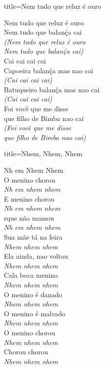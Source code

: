 \documentclass[fontsize=14pt, paper=a4, twoside, DIV=20]{scrreprt} %
\begin{document}
\begin{multicols*}{2}
\begin{song}{title={Nem tudo que reluz é ouro}}
        \begin{verse*}
            Nem tudo que reluz é ouro\\
            Nem tudo que balanḉa cai\\
            \textit{(Nem tudo que reluz é ouro}\\
            \textit{Nem tudo que balanḉa cai)}\\
            Cai cai cai cai\\
            Capoeira balanḉa mas nao cai\\
            \textit{(Cai cai cai cai)}\\
            Batuqueiro balanḉa mas nao cai\\
            \textit{(Cai cai cai cai)}\\
            Foi você que me disse\\
            que filho de Bimba nao cai\\
            \textit{(Foi você que me disse}\\
            \textit{que filho de Bimba nao cai)}\\
        \end{verse*}
\end{song}

\begin{song}{title={Nhem, Nhem, Nhem}}
        \begin{verse*}
            Nh em Nhem Nhem\\
            O menino chorou\\
            \textit{Nh} \textit{em nhem nhem}\\
            E menino chorou\\
            \textit{Nh} \textit{em nhem nhem}\\
            rque não mamou\\
            \textit{Nh} \textit{em nhem nhem}\\
            Sua mãe tá na feira\\
            \textit{Nhem nhem nhem}\\
            Ela ainda, nao voltou\\
            \textit{Nhem nhem nhem}\\
            Cala boca menino\\
            \textit{Nhem nhem nhem}\\
            O menino é danado\\
            \textit{Nhem nhem nhem}\\
            O menino é malvado\\
            \textit{Nhem nhem nhem}\\
            O menino chorou\\
            \textit{Nhem nhem nhem}\\
            Chorou chorou\\
            \textit{Nhem nhem nhem}\\
        \end{verse*}
\end{song}


\end{multicols*}
\end{document}
